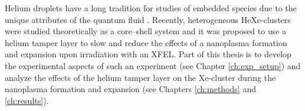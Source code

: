 %
Helium droplets have a long tradition for studies of embedded species due to the unique attributes of the quantum fluid \citep{VonHaeften-1997-PRL,VonPietrowski-2006-EPJ,Stienkemeier-2006-JPhysB,Buchta-2013-JCPA,Gomez-2014-Science}. Recently, heterogeneous HeXe-clusters were studied theoretically as a core--shell system \citep{Mikaberidze-2008-PRA} and it was proposed to use a helium tamper layer to slow and reduce the effects of a nanoplasma formation and expansion upon irradiation with an XFEL. Part of this thesis is to develop the experimental aspects of such an experiment (see Chapter \ref{ch:exp_setup}) and analyze the effects of the helium tamper layer on the Xe-cluster during the nanoplasma formation and expansion (see Chapters \ref{ch:methods} and \ref{ch:results}).\\[1\baselineskip]
%
%
%
%
%